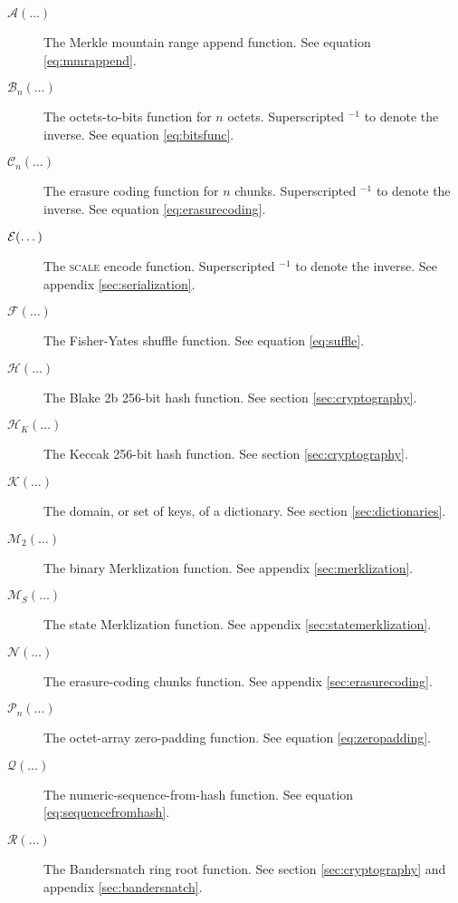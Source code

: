 \begin{description}
  \item[$\mathcal{A}(\dots)$] The Merkle mountain range append function. See equation \ref{eq:mmrappend}.
  \item[$\mathcal{B}_n(\dots)$] The octets-to-bits function for $n$ octets. Superscripted ${}^{-1}$ to denote the inverse. See equation \ref{eq:bitsfunc}.
  \item[$\mathcal{C}_n(\dots)$] The erasure coding function for $n$ chunks. Superscripted ${}^{-1}$ to denote the inverse. See equation \ref{eq:erasurecoding}.
  \item[$\mathcal{E}(\dots)$] The \textsc{scale} encode function. Superscripted ${}^{-1}$ to denote the inverse. See appendix \ref{sec:serialization}.
  \item[$\mathcal{F}(\dots)$] The Fisher-Yates shuffle function. See equation \ref{eq:suffle}.
  \item[$\mathcal{H}(\dots)$] The Blake 2b 256-bit hash function. See section \ref{sec:cryptography}.
  \item[$\mathcal{H}_K(\dots)$] The Keccak 256-bit hash function. See section \ref{sec:cryptography}.
  \item[$\mathcal{K}(\dots)$] The domain, or set of keys, of a dictionary. See section \ref{sec:dictionaries}.
  \item[$\mathcal{M}_2(\dots)$] The binary Merklization function. See appendix \ref{sec:merklization}.
  \item[$\mathcal{M}_S(\dots)$] The state Merklization function. See appendix \ref{sec:statemerklization}.
  \item[$\mathcal{N}(\dots)$] The erasure-coding chunks function. See appendix \ref{sec:erasurecoding}.
  \item[$\mathcal{P}_n(\dots)$] The octet-array zero-padding function. See equation \ref{eq:zeropadding}.
  \item[$\mathcal{Q}(\dots)$] The numeric-sequence-from-hash function. See equation \ref{eq:sequencefromhash}.
  \item[$\mathcal{R}(\dots)$] The Bandersnatch ring root function. See section \ref{sec:cryptography} and appendix \ref{sec:bandersnatch}.

\end{description}
